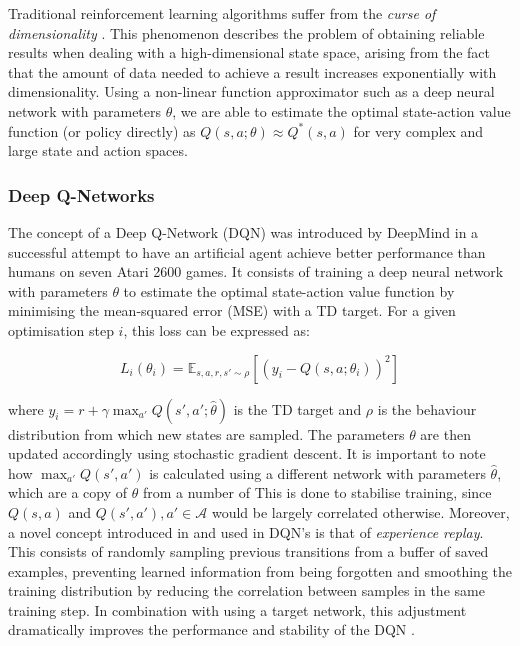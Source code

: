 \documentclass[12pt,twoside]{report}
\begin{document}
Traditional reinforcement learning algorithms suffer from the \textit{curse of dimensionality} \cite{bellman-dp}. This phenomenon describes the problem of obtaining reliable results when dealing with a high-dimensional state space, arising from the fact that the amount of data needed to achieve a result increases exponentially with dimensionality. Using a non-linear function approximator such as a deep neural network with parameters $\theta$, we are able to estimate the optimal state-action value function (or policy directly) as $Q(s,a; \theta) \approx Q^*(s,a)$ for very complex and large state and action spaces. 

\subsubsection{Deep Q-Networks}

The concept of a Deep Q-Network (DQN) \cite{deep-rl} was introduced by DeepMind in a successful attempt to have an artificial agent achieve better performance than humans on seven Atari 2600 games. It consists of training a deep neural network with parameters $\theta$ to estimate the optimal state-action value function by minimising the mean-squared error (MSE) with a TD target. For a given optimisation step $i$, this loss can be expressed as: 

\begin{equation}
    L_i(\theta_i) = \mathbb{E}_{s,a,r,s' \sim \rho} \left[ \left(y_i - Q(s,a; \theta_i) \right)^2\right]
\end{equation}

\noindent where $y_i = r + \gamma \max_{a'} Q(s',a'; \hat{\theta})$ is the TD target and $\rho$ is the behaviour distribution from which new states are sampled. The parameters $\theta$ are then updated accordingly using stochastic gradient descent. It is important to note how $\max_{a'} Q(s',a')$ is calculated using a different network with parameters $\hat{\theta}$, which are a copy of $\theta$ from a number of  This is done to stabilise training, since $Q(s,a)$ and $Q(s', a'), a' \in \mathcal{A}$ would be largely correlated otherwise. Moreover, a novel concept introduced in \cite{experience-replay} and used in DQN's is that of \textit{experience replay}. This consists of randomly sampling previous transitions from a buffer of saved examples, preventing learned information from being forgotten and smoothing the training distribution by reducing the correlation between samples in the same training step. In combination with using a target network, this adjustment dramatically improves the performance and stability of the DQN \cite{deep-q-networks}. 
\end{document}
